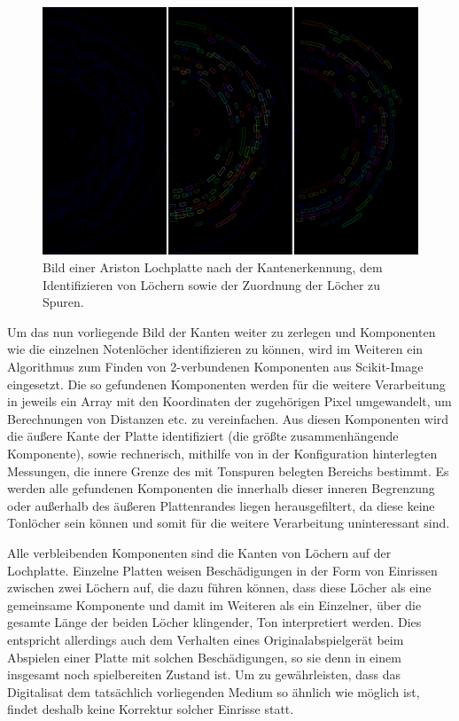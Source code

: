 \begin{figure}[t]
    \centering
    \includegraphics[width=\textwidth]{graphics/processing.png}
    \caption{Bild einer Ariston Lochplatte nach der Kantenerkennung, dem Identifizieren von Löchern sowie der Zuordnung der Löcher zu Spuren.}
    \label{pipelinesteps}
\end{figure}

Um das nun vorliegende Bild der Kanten weiter zu zerlegen und Komponenten wie die einzelnen Notenlöcher identifizieren zu können, wird im Weiteren ein Algorithmus zum Finden von 2-verbundenen Komponenten aus Scikit-Image \parencite[]{scikit-image} eingesetzt.
Die so gefundenen Komponenten werden für die weitere Verarbeitung in jeweils ein Array mit den Koordinaten der zugehörigen Pixel umgewandelt, um Berechnungen von Distanzen etc. zu vereinfachen.
Aus diesen Komponenten wird die äußere Kante der Platte identifiziert (die größte zusammenhängende Komponente), sowie rechnerisch, mithilfe von in der Konfiguration hinterlegten Messungen, die innere Grenze des mit Tonspuren belegten Bereichs bestimmt.
Es werden alle gefundenen Komponenten die innerhalb dieser inneren Begrenzung oder außerhalb des äußeren Plattenrandes liegen herausgefiltert, da diese keine Tonlöcher sein können und somit für die weitere Verarbeitung uninteressant sind.

Alle verbleibenden Komponenten sind die Kanten von Löchern auf der Lochplatte.
Einzelne Platten weisen Beschädigungen in der Form von Einrissen zwischen zwei Löchern auf, die dazu führen können, dass diese Löcher als eine gemeinsame Komponente und damit im Weiteren als ein Einzelner, über die gesamte Länge der beiden Löcher klingender, Ton interpretiert werden.
Dies entspricht allerdings auch dem Verhalten eines Originalabspielgerät beim Abspielen einer Platte mit solchen Beschädigungen, so sie denn in einem insgesamt noch spielbereiten Zustand ist.
Um zu gewährleisten, dass das Digitalisat dem tatsächlich vorliegenden Medium so ähnlich wie möglich ist, findet deshalb keine Korrektur solcher Einrisse statt.

